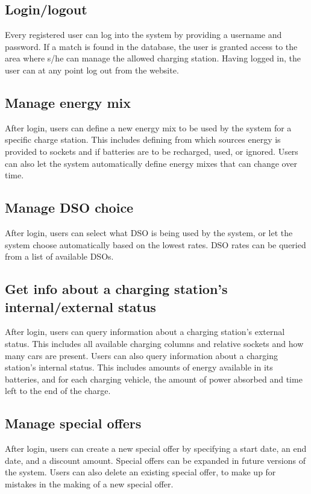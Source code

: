 \subsection{Login/logout}

Every registered user can log into the system by providing a username and password. If a match is found in the database, the user is granted access to the area where s/he can manage the allowed charging station. Having logged in, the user can at any point log out from the website.

\subsection{Manage energy mix}

After login, users can define a new energy mix to be used by the system for a specific charge station. This includes defining from which sources energy is provided to sockets and if batteries are to be recharged, used, or ignored. Users can also let the system automatically define energy mixes that can change over time.

\subsection{Manage DSO choice}

After login, users can select what DSO is being used by the system, or let the system choose automatically based on the lowest rates. DSO rates can be queried from a list of available DSOs.

\subsection{Get info about a charging station's internal/external status}

After login, users can query information about a charging station's external status. This includes all available charging columns and relative sockets and how many cars are present. Users can also query information about a charging station's internal status. This includes amounts of energy available in its batteries, and for each charging vehicle, the amount of power absorbed and time left to the end of the charge.

\subsection{Manage special offers}

After login, users can create a new special offer by specifying a start date, an end date, and a discount amount. Special offers can be expanded in future versions of the system. Users can also delete an existing special offer, to make up for mistakes in the making of a new special offer.


